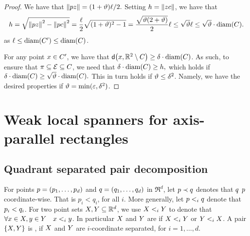 \documentclass[12pt]{article}%
\begin{document}
\begin{proof}
    We have that
    \begin{math}
        \left\| p z \right\| = (1+\vartheta)\ell/2.
    \end{math}
    Setting $h = \left\| z c \right\|$, we have that
    \begin{equation*}
        h%
        =%
        \sqrt{\dY{\pa}{\pz}^2 - \dY{\pa}{\cen}^2 }
        =%
        \frac{\ell}{2} \sqrt{(1+\epsA)^2 - 1}
        =%
        \frac{\sqrt{\epsA (2+\epsA)}}{2} \ell%
        \leq
        \sqrt{\epsA} \ell
        \leq
        \sqrt{\epsA}\cdot \diameterX{\body}.
    \end{equation*}
    as $\ell \leq \diameterX{\body'} \leq \diameterX{\body}$.

    For any point $x \in C'$, we have that
    $\dsY{\px}{\Re^2 \setminus \body} \geq \delta \cdot
    \diamX{\body}$.  As such, to ensure that
    $\pi \subseteq \mathcal{E} \subseteq C$, we need that
    \begin{math}
        \delta \cdot \diamX{\body} \geq h,
    \end{math}
    which holds if
    \begin{math}
        \delta \cdot \diamX{\body} \geq \sqrt{\epsA} \cdot
        \diameterX{\body}.
    \end{math}
    This in turn holds if $\vartheta \leq \delta^2$. Namely, we have the
    desired properties if $\vartheta = \min( \varepsilon, \delta^2)$.
\end{proof}




\section{Weak local spanners for axis-parallel rectangles}
\subsection{Quadrant separated pair decomposition}

For points $p = (p_1, \ldots, p_d)$ and $q = (q_1, \ldots, q_d)$
in $\Re^d$, let $p \prec q$ denotes that $q$ 
$p$ coordinate-wise. That is $p_i < q_i$, for all $i$. More
generally, let $p <_i q$ denote that $p_i < q_i$. For two
point sets $X, Y \subseteq \mathbb{R}^d$, we use $X <_i Y$ to
denote that $\forall x \in X, y \in Y \quad x <_i y$.
In particular $X$ and $Y$ are 
if $X <_i Y$ or $Y <_i X$. A pair $\{ X, Y\}$ is
, if $X$ and $Y$ are $i$-coordinate
separated, for $i=1,\ldots, d$.
\end{document}
